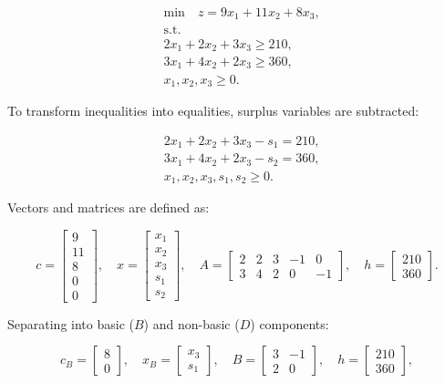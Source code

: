 \documentclass[unicode,11pt,a4paper,oneside,numbers=endperiod,openany]{scrartcl}
\begin{document}
\[
 \begin{aligned}
 &\text{min} \quad z = 9x_1 + 11x_2 + 8x_3, \\
 &\text{s.t.} \\
 & 2x_1 + 2x_2 + 3x_3 \geq 210, \\
 & 3x_1 + 4x_2 + 2x_3 \geq 360, \\
 & x_1, x_2, x_3 \geq 0.
 \end{aligned}
\]

To transform inequalities into equalities, surplus variables are subtracted:

\[
 \begin{aligned}
 & 2x_1 + 2x_2 + 3x_3 - s_1 = 210, \\
 & 3x_1 + 4x_2 + 2x_3 - s_2 = 360, \\
 & x_1, x_2, x_3, s_1, s_2 \geq 0.
 \end{aligned}
\]

Vectors and matrices are defined as:

\[
c = \begin{bmatrix} 9 \\ 11 \\ 8 \\ 0 \\ 0 \end{bmatrix}, \quad
x = \begin{bmatrix} x_1 \\ x_2 \\ x_3 \\ s_1 \\ s_2 \end{bmatrix}, \quad
A = \begin{bmatrix} 2 & 2 & 3 & -1 & 0 \\ 3 & 4 & 2 & 0 & -1 \end{bmatrix}, \quad
h = \begin{bmatrix} 210 \\ 360 \end{bmatrix}.
\]

Separating into basic (\(B\)) and non-basic (\(D\)) components:

\[
c_B = \begin{bmatrix} 8 \\ 0 \end{bmatrix}, \quad
x_B = \begin{bmatrix} x_3 \\ s_1 \end{bmatrix}, \quad
B = \begin{bmatrix} 3 & -1 \\ 2 & 0 \end{bmatrix}, \quad
h = \begin{bmatrix} 210 \\ 360 \end{bmatrix},
\]
\end{document}
